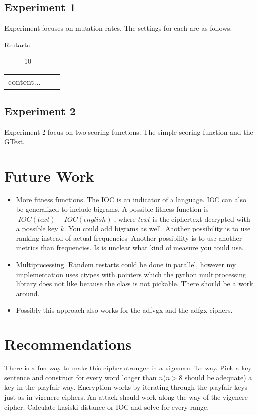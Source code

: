 \documentclass[]{article}
\begin{document}
\subsection{Experiment 1}
Experiment focuses on mutation rates. The settings for each are as follows:
\begin{description}
	\item[Restarts] 10
	
\end{description}
\begin{tabular}{|l|l|l|}
	content...
\end{tabular}
\subsection{Experiment 2}
Experiment 2 focus on two scoring functions. The simple scoring function and the GTest.
\section{Future Work}
\begin{itemize}
	\item More fitness functions. The IOC is an indicator of a language. IOC can also be generalized to include bigrams. A possible fitness function is $|IOC(text) - IOC(english)|$, where $text$ is the ciphertext decrypted with a possible key $k$. You could add bigrams as well. Another possibility is to use ranking instead of actual frequencies. Another possibility is to use another metrics than frequencies. Is is unclear what kind of measure you could use.
	\item Multiprocessing. Random restarts could be done in parallel, however my implementation uses ctypes with pointers which the python multiprocessing library does not like because the class is not pickable. There should be a work around.
	\item Possibly this approach also works for the adfvgx and the adfgx ciphers.
\end{itemize}
\section{Recommendations}
There is a fun way to make this cipher stronger in a vigenere like way. Pick a key sentence and construct  for every word longer than $n$($n>8$ should be adequate) a key in the playfair way. Encryption works by iterating through the playfair keys just as in vigenere ciphers.
An attack should work along the way of the vigenere cipher. Calculate kasiski distance or IOC and solve for every range.
\end{document}
